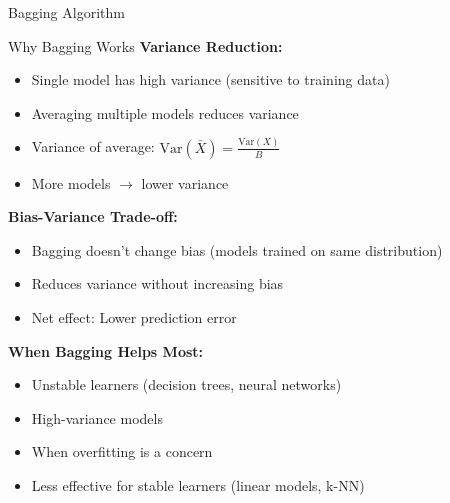 \documentclass[aspectratio=169]{beamer}
\begin{document}
\begin{frame}{Bagging Algorithm}
\begin{center}
\end{center}
\end{frame}

\begin{frame}{Why Bagging Works}
\footnotesize
\textbf{Variance Reduction:}
\begin{itemize}
    \item Single model has high variance (sensitive to training data)
    \item Averaging multiple models reduces variance
    \item Variance of average: $\text{Var}(\bar{X}) = \frac{\text{Var}(X)}{B}$
    \item More models $\rightarrow$ lower variance
\end{itemize}

\vspace{0.15cm}
\textbf{Bias-Variance Trade-off:}
\begin{itemize}
    \item Bagging doesn't change bias (models trained on same distribution)
    \item Reduces variance without increasing bias
    \item Net effect: Lower prediction error
\end{itemize}

\vspace{0.15cm}
\textbf{When Bagging Helps Most:}
\begin{itemize}
    \item Unstable learners (decision trees, neural networks)
    \item High-variance models
    \item When overfitting is a concern
    \item Less effective for stable learners (linear models, k-NN)
\end{itemize}
\end{frame}
\end{document}
